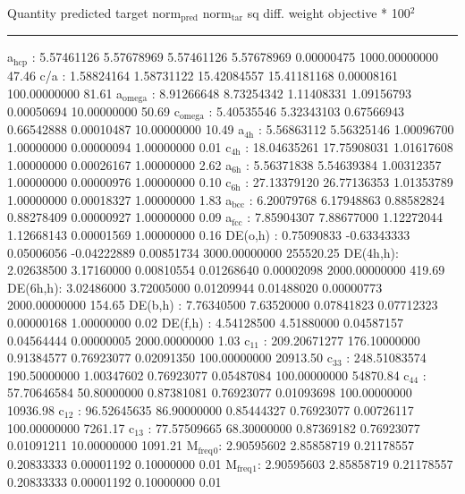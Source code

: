 \documentclass[11pt]{article}
\begin{document}
Quantity      predicted    target     norm\(_{\text{pred}}\)   norm\(_{\text{tar}}\)    sq diff.      weight    objective * 100\(^{\text{2}}\) 

\noindent\rule{\textwidth}{0.5pt}
a\(_{\text{hcp}}\)   :   5.57461126   5.57678969   5.57461126   5.57678969   0.00000475 1000.00000000        47.46
c/a     :   1.58824164   1.58731122  15.42084557  15.41181168   0.00008161 100.00000000        81.61
a\(_{\text{omega}}\) :   8.91266648   8.73254342   1.11408331   1.09156793   0.00050694  10.00000000        50.69
c\(_{\text{omega}}\) :   5.40535546   5.32343103   0.67566943   0.66542888   0.00010487  10.00000000        10.49
a\(_{\text{4h}}\)    :   5.56863112   5.56325146   1.00096700   1.00000000   0.00000094   1.00000000         0.01
c\(_{\text{4h}}\)    :  18.04635261  17.75908031   1.01617608   1.00000000   0.00026167   1.00000000         2.62
a\(_{\text{6h}}\)    :   5.56371838   5.54639384   1.00312357   1.00000000   0.00000976   1.00000000         0.10
c\(_{\text{6h}}\)    :  27.13379120  26.77136353   1.01353789   1.00000000   0.00018327   1.00000000         1.83
a\(_{\text{bcc}}\)   :   6.20079768   6.17948863   0.88582824   0.88278409   0.00000927   1.00000000         0.09
a\(_{\text{fcc}}\)   :   7.85904307   7.88677000   1.12272044   1.12668143   0.00001569   1.00000000         0.16
DE(o,h) :   0.75090833  -0.63343333   0.05006056  -0.04222889   0.00851734 3000.00000000    255520.25
DE(4h,h):   2.02638500   3.17160000   0.00810554   0.01268640   0.00002098 2000.00000000       419.69
DE(6h,h):   3.02486000   3.72005000   0.01209944   0.01488020   0.00000773 2000.00000000       154.65
DE(b,h) :   7.76340500   7.63520000   0.07841823   0.07712323   0.00000168   1.00000000         0.02
DE(f,h) :   4.54128500   4.51880000   0.04587157   0.04564444   0.00000005 2000.00000000         1.03
c\(_{\text{11}}\)    : 209.20671277 176.10000000   0.91384577   0.76923077   0.02091350 100.00000000     20913.50
c\(_{\text{33}}\)    : 248.51083574 190.50000000   1.00347602   0.76923077   0.05487084 100.00000000     54870.84
c\(_{\text{44}}\)    :  57.70646584  50.80000000   0.87381081   0.76923077   0.01093698 100.00000000     10936.98
c\(_{\text{12}}\)    :  96.52645635  86.90000000   0.85444327   0.76923077   0.00726117 100.00000000      7261.17
c\(_{\text{13}}\)    :  77.57509665  68.30000000   0.87369182   0.76923077   0.01091211  10.00000000      1091.21
M\(_{\text{freq}}\)\(_{\text{0}}\):   2.90595602   2.85858719   0.21178557   0.20833333   0.00001192   0.10000000         0.01
M\(_{\text{freq}}\)\(_{\text{1}}\):   2.90595603   2.85858719   0.21178557   0.20833333   0.00001192   0.10000000         0.01
\end{document}
